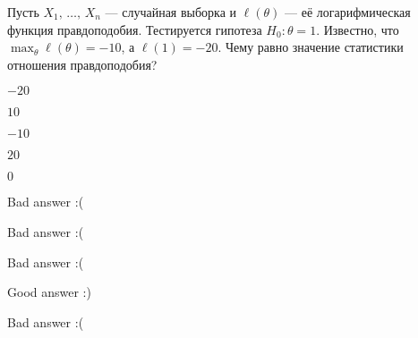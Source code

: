 
\begin{question}
Пусть \(X_1, \, \ldots, \, X_n\) --- случайная выборка и
\(\ell(\theta)\) --- её логарифмическая функция правдоподобия.
Тестируется гипотеза \(H_0: \theta = 1\). Известно, что
\(\max_{\theta}\ell(\theta) = -10\), а \(\ell(1) = -20\). Чему равно
значение статистики отношения правдоподобия?
\begin{answerlist}
  \item \(-20\)
  \item \(10\)
  \item \(-10\)
  \item \(20\)
  \item \(0\)
\end{answerlist}
\end{question}

\begin{solution}
\begin{answerlist}
  \item Bad answer :(
  \item Bad answer :(
  \item Bad answer :(
  \item Good answer :)
  \item Bad answer :(
\end{answerlist}
\end{solution}

